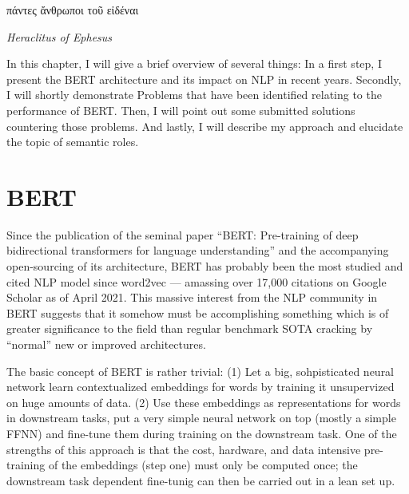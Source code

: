 \label{chap:2_approach}

\epigraph{\textgreek{πάντες ἄνθρωποι τοῦ εἰδέναι}}{\textit{Heraclitus of Ephesus}}


In this chapter, I will give a brief overview of several things: In a first step, I present
the BERT architecture and its impact on NLP in recent years. Secondly, I will shortly demonstrate
Problems that have been identified relating to the performance of BERT. Then, I will point out
some submitted solutions countering those problems. And lastly, I will describe my approach and
elucidate the topic of semantic roles.

\section{BERT}

Since the publication of the seminal paper ``BERT: Pre-training of deep bidirectional transformers
for language understanding'' \cite{devlin2018bert} and the accompanying open-sourcing of its
architecture, BERT has probably been the
most studied and cited NLP model since word2vec \cite{mikolov2013distributed} --- amassing over
17,000 citations on Google Scholar as of April 2021. This massive interest from the NLP community
in BERT suggests that it somehow must be accomplishing something which is of greater significance
to the field than regular benchmark SOTA cracking by ``normal'' new or improved architectures.


The basic concept of BERT is rather trivial: (1) Let a big, sohpisticated neural network learn
contextualized embeddings for words by training it unsupervized on huge amounts of data. (2)
Use these embeddings as representations for words in downstream tasks, put a very simple neural
network on top (mostly a simple FFNN) and fine-tune them during training on the downstream task.
One of the strengths of this approach is that the cost, hardware, and data intensive pre-training of the
embeddings (step one) must only be computed once; the downstream task dependent fine-tunig can then
be carried out in a lean set up.

